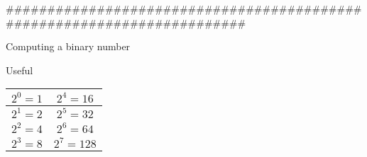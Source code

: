 ########################################################################

Computing a binary number

Useful
{
\begin{center}
\begin{tabular}{|c|c|}
\hline $2^0 = 1 $ & $2^4 = 16  $ \\ 
\hline $2^1 = 2 $ & $2^5 = 32$ \\ 
\hline $2^2 = 4 $ & $2^6 = 64$ \\ 
\hline $2^3 = 8 $ & $ 2^7 = 128$ \\ 
\hline 
\end{tabular} 
\end{center}
}


